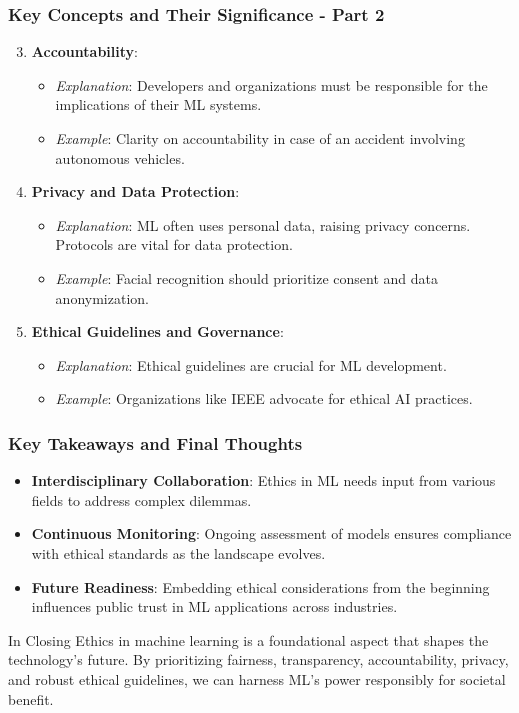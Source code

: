 \documentclass[aspectratio=169]{beamer}
\begin{document}
\begin{frame}[fragile]
    \frametitle{Key Concepts and Their Significance - Part 2}
    \begin{enumerate}
        \setcounter{enumi}{2} %
        \item \textbf{Accountability}:
        \begin{itemize}
            \item \textit{Explanation}: Developers and organizations must be responsible for the implications of their ML systems.
            \item \textit{Example}: Clarity on accountability in case of an accident involving autonomous vehicles.
        \end{itemize}

        \item \textbf{Privacy and Data Protection}:
        \begin{itemize}
            \item \textit{Explanation}: ML often uses personal data, raising privacy concerns. Protocols are vital for data protection.
            \item \textit{Example}: Facial recognition should prioritize consent and data anonymization.
        \end{itemize}

        \item \textbf{Ethical Guidelines and Governance}:
        \begin{itemize}
            \item \textit{Explanation}: Ethical guidelines are crucial for ML development.
            \item \textit{Example}: Organizations like IEEE advocate for ethical AI practices.
        \end{itemize}
    \end{enumerate}
\end{frame}

\begin{frame}[fragile]
    \frametitle{Key Takeaways and Final Thoughts}
    \begin{itemize}
        \item \textbf{Interdisciplinary Collaboration}: Ethics in ML needs input from various fields to address complex dilemmas.
        \item \textbf{Continuous Monitoring}: Ongoing assessment of models ensures compliance with ethical standards as the landscape evolves.
        \item \textbf{Future Readiness}: Embedding ethical considerations from the beginning influences public trust in ML applications across industries.
    \end{itemize}

    \begin{block}{In Closing}
        Ethics in machine learning is a foundational aspect that shapes the technology's future. By prioritizing fairness, transparency, accountability, privacy, and robust ethical guidelines, we can harness ML's power responsibly for societal benefit.
    \end{block}
\end{frame}
\end{document}
